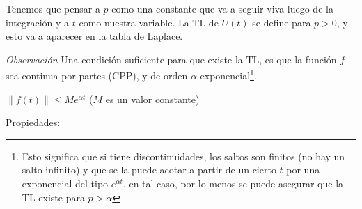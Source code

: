 Tenemos que pensar a $p$ como una constante que va a seguir viva luego de la integraci\'on y a $t$ como nuestra variable. La TL de $U(t)$ se define para $p>0$, y esto va a aparecer en la tabla de Laplace.

\emph{Observaci\'on} Una condici\'on suficiente para que existe la TL, es que la funci\'on $f$ sea continua por partes (CPP), y de orden $\alpha$-exponencial\footnote{Esto significa que si tiene discontinuidades, los saltos son finitos (no hay un salto infinito) y que se la puede acotar a partir de un cierto $t$ por una exponencial del tipo $e^{\alpha t}$, en tal caso, por lo menos se puede asegurar que la TL existe para $p > \alpha$}.

$\|f(t)\| \leq M e^{\alpha t}$ ($M$ es un valor constante) %



Propiedades:

